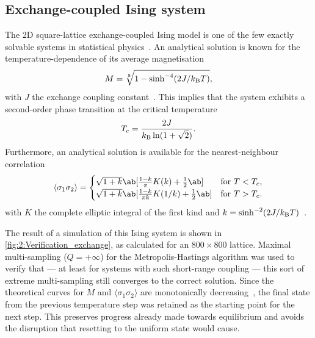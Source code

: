 
\subsection{Exchange-coupled Ising system}
\label{sec:2:Verification_OOP_Exchange}
The 2D square-lattice exchange-coupled Ising model is one of the few exactly solvable systems in statistical physics~\cite{ExactlySolvedModelsStatMech}.
An analytical solution is known for the temperature-dependence of its average magnetisation
\begin{equation}
	M = \sqrt[8]{1 - \sinh^{-4}(2J/\kBT)} \mathrm{,}
	\label{eq:2:Verification_exchange_M}
\end{equation}
with $J$ the exchange coupling constant~\cite{Correlations2DIsing,IsingSpontaneousMagnetization,coey2010magnetism}.
This implies that the system exhibits a second-order phase transition at the critical temperature~\cite{ExactlySolvedModelsStatMech}
\begin{equation}
	T_c = \frac{2J}{\kB \ln(1 + \sqrt{2})} \mathrm{.}
\end{equation}
Furthermore, an analytical solution is available for the nearest-neighbour correlation
\begin{equation}
	\langle \sigma_{1} \sigma_{2} \rangle = 
	\begin{cases}
		\sqrt{1+k} \ab[\frac{1-k}{\pi}K(k) + \frac{1}{2} \ab] &\text{for } T < T_c \mathrm{,} \\ 
		\sqrt{1+k} \ab[\frac{1-k}{\pi k}K(1/k) + \frac{1}{2} \ab] &\text{for } T > T_c \mathrm{.} \\ 
	\end{cases}
\end{equation}
with $K$ the complete elliptic integral of the first kind and $k=\sinh^{-2}(2J/\kBT)$~\cite{Correlations2DIsing}. \\\par

The result of a \hotspice simulation of this Ising system is shown in \cref{fig:2:Verification_exchange}, as calculated for an $800 \times 800$ lattice.
Maximal multi-sampling ($Q=+\infty$) for the Metropolis-Hastings algorithm was used to verify that --- at least for systems with such short-range coupling --- this sort of extreme multi-sampling still converges to the correct solution.
Since the theoretical curves for $M$ and $\langle \sigma_{1} \sigma_{2} \rangle$ are monotonically decreasing~\cite{MCinStatPhys}, the final state from the previous temperature step was retained as the starting point for the next step. This preserves progress already made towards equilibrium and avoids the disruption that resetting to the uniform state would cause. \par

